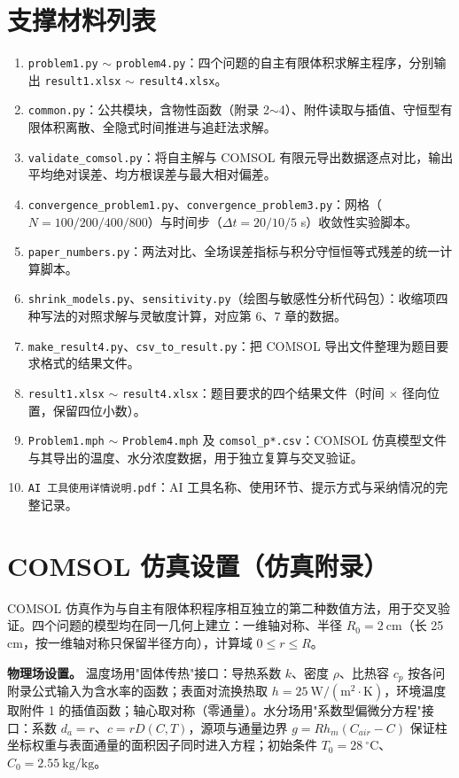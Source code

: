\documentclass[12pt,a4paper]{article}
\begin{document}
\section{支撑材料列表}

\begin{enumerate}[label=(\arabic*)]
  \item \texttt{problem1.py} $\sim$ \texttt{problem4.py}：四个问题的自主有限体积求解主程序，分别输出 \texttt{result1.xlsx} $\sim$ \texttt{result4.xlsx}。
  \item \texttt{common.py}：公共模块，含物性函数（附录 2$\sim$4）、附件读取与插值、守恒型有限体积离散、全隐式时间推进与追赶法求解。
  \item \texttt{validate\_comsol.py}：将自主解与 COMSOL 有限元导出数据逐点对比，输出平均绝对误差、均方根误差与最大相对偏差。
  \item \texttt{convergence\_problem1.py}、\texttt{convergence\_problem3.py}：网格（$N=100/200/400/800$）与时间步（$\Delta t=20/10/5$ s）收敛性实验脚本。
  \item \texttt{paper\_numbers.py}：两法对比、全场误差指标与积分守恒恒等式残差的统一计算脚本。
  \item \texttt{shrink\_models.py}、\texttt{sensitivity.py}（绘图与敏感性分析代码包）：收缩项四种写法的对照求解与灵敏度计算，对应第 6、7 章的数据。
  \item \texttt{make\_result4.py}、\texttt{csv\_to\_result.py}：把 COMSOL 导出文件整理为题目要求格式的结果文件。
  \item \texttt{result1.xlsx} $\sim$ \texttt{result4.xlsx}：题目要求的四个结果文件（时间 $\times$ 径向位置，保留四位小数）。
  \item \texttt{Problem1.mph} $\sim$ \texttt{Problem4.mph} 及 \texttt{comsol\_p*.csv}：COMSOL 仿真模型文件与其导出的温度、水分浓度数据，用于独立复算与交叉验证。
  \item \texttt{AI 工具使用详情说明.pdf}：AI 工具名称、使用环节、提示方式与采纳情况的完整记录。
\end{enumerate}

\section{COMSOL 仿真设置（仿真附录）}

COMSOL 仿真作为与自主有限体积程序相互独立的第二种数值方法，用于交叉验证。四个问题的模型均在同一几何上建立：一维轴对称、半径 $R_0=2\ \mathrm{cm}$（长 25 cm，按一维轴对称只保留半径方向），计算域 $0\le r\le R$。

\textbf{物理场设置。} 温度场用"固体传热"接口：导热系数 $k$、密度 $\rho$、比热容 $c_p$ 按各问附录公式输入为含水率的函数；表面对流换热取 $h=25\ \mathrm{W/(m^2\cdot K)}$，环境温度取附件 1 的插值函数；轴心取对称（零通量）。水分场用"系数型偏微分方程"接口：系数 $d_a=r$、$c=rD(C,T)$，源项与通量边界 $g=Rh_m(C_{air}-C)$ 保证柱坐标权重与表面通量的面积因子同时进入方程；初始条件 $T_0=28\ \mathrm{^\circ C}$、$C_0=2.55\ \mathrm{kg/kg}$。
\end{document}
